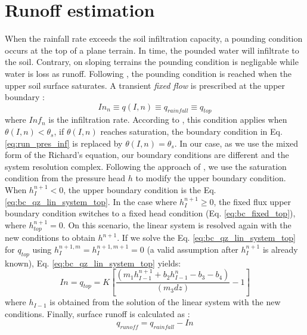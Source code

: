 \documentclass[a4paper,12pt]{article}
\begin{document}
\section{Runoff estimation}
When the rainfall rate exceeds the soil infiltration capacity, a pounding condition occurs at the top of a plane terrain. In time, the pounded water will infiltrate to the soil. Contrary, on sloping terrains the pounding condition is negligable while water is loss as runoff. Following \cite{Herradaetal2014}, the pounding condition is reached when the upper soil surface saturates.
A transient \emph{fixed flow} is prescribed at the upper boundary \citep{Herradaetal2014}:
 \begin{equation} \label{eq:run_pres_inf}
 	In_{n} \equiv q(I,n) \equiv q_{rainfall} \equiv q_{top}
\end{equation}
where $Inf_n$ is the infiltration rate.
According to \cite{Herradaetal2014}, this condition applies when $\theta(I,n)<\theta_s$, if $\theta(I,n)$ reaches saturation, the boundary condition in Eq. \ref{eq:run_pres_inf} is replaced by $\theta(I,n)=\theta_s$.
In our case, as we use the mixed form of the Richard's equation, our boundary conditions are different and the system resolution complex. Following the approach of \cite{Herradaetal2014}, we use the saturation condition from the pressure head $h$ to modify the upper boundary condition. When $h_I^{n+1}<0$, the upper boundary condition is the Eq. \ref{eq:bc_qz_lin_system_top}. In the case where $h_I^{n+1}\geq0$, the fixed flux upper boundary condition switches to a fixed head condition (Eq. \ref{eq:bc_fixed_top}), where $h_{top}^{n+1}=0$. On this scenario, the linear system is resolved again with the new conditions to obtain $h^{n+1}$.
If we solve the Eq. \ref{eq:bc_qz_lin_system_top} for $q_{top}$ using $h_I^{n+1,m}=h_I^{n+1,m+1}=0$ (a valid assumption after $h_I^{n+1}$ is already known), Eq. \ref{eq:bc_qz_lin_system_top} yields:
\begin{equation} \label{eq:run_pres_inf}
 	In=q_{top}=K\left[\frac{\left( m_1h_{I-1}^{n+1}+b_2h_{I-1}^n-b_3-b_4\right) }{\left( m_3dz\right) }-1 \right] 
\end{equation}
where $h_{I-1}$ is obtained from the solution of the linear system with the new conditions.
Finally, surface runoff is calculated as \citep{Herradaetal2014}:
\begin{equation}
    q_{runoff}=q_{rainfall}-In
    \label{eq:run_run}
\end{equation}
\end{document}

